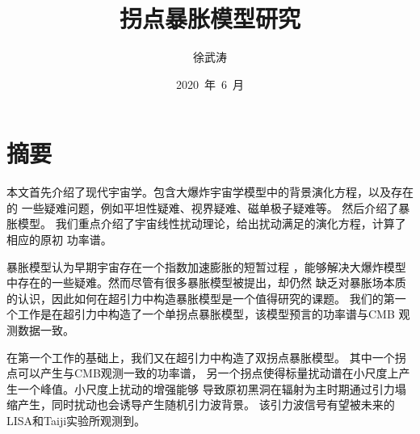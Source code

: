 \confidential{}%
\title{拐点暴胀模型研究}%
\author{徐武涛}%
\date{2020~年~6~月}%
\maketitle%
\MAKETITLE%
\makedeclaration%
\intobmk\chapter*{摘\quad 要}%
\setcounter{page}{1}%


本文首先介绍了现代宇宙学。包含大爆炸宇宙学模型中的背景演化方程，以及存在的
一些疑难问题，例如平坦性疑难、视界疑难、磁单极子疑难等。
然后介绍了暴胀模型。
我们重点介绍了宇宙线性扰动理论，给出扰动满足的演化方程，计算了相应的原初
功率谱。

暴胀模型认为早期宇宙存在一个指数加速膨胀的短暂过程
，能够解决大爆炸模型中存在的一些疑难。然而尽管有很多暴胀模型被提出，却仍然
缺乏对暴胀场本质的认识，因此如何在超引力中构造暴胀模型是一个值得研究的课题。
我们的第一个工作是在超引力中构造了一个单拐点暴胀模型，该模型预言的功率谱与CMB
观测数据一致。

在第一个工作的基础上，我们又在超引力中构造了双拐点暴胀模型。
其中一个拐点可以产生与CMB观测一致的功率谱，
另一个拐点使得标量扰动谱在小尺度上产生一个峰值。小尺度上扰动的增强能够
导致原初黑洞在辐射为主时期通过引力塌缩产生，同时扰动也会诱导产生随机引力波背景。
该引力波信号有望被未来的LISA和Taiji实验所观测到。

